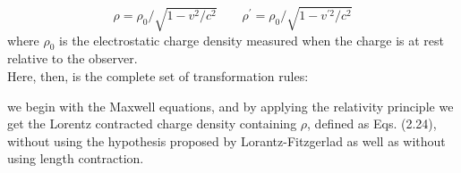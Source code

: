 \begin{equation}
\rho=\rho_{0} / \sqrt{1-v^{2} / c^{2}} \quad \quad \rho^{\prime}=\rho_{0} / \sqrt{1-v^{\prime 2} / c^{2}}
\end{equation}
where $\rho_{0}$ is the electrostatic charge density measured when the charge is at rest relative to the observer.\\
 Here, then, is the complete set of transformation rules:
 \begin{center}
 \end{center}
 we begin with the Maxwell equations, and by applying the relativity principle we get the Lorentz contracted charge density containing $\rho$, defined as Eqs. (2.24), without using the hypothesis proposed by Lorantz-Fitzgerlad as well as without using length contraction.















